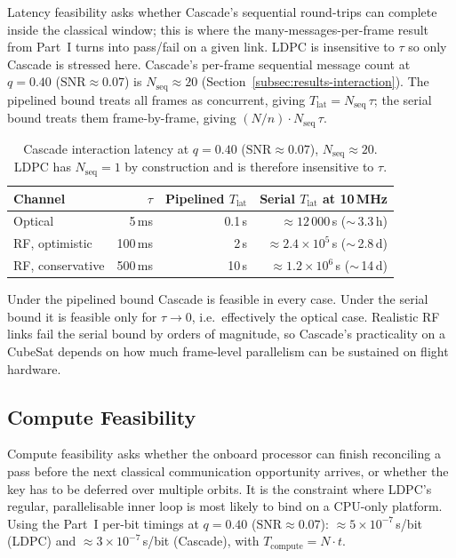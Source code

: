 \documentclass{UoYCSproject}
\begin{document}
Latency feasibility asks whether Cascade's sequential round-trips can
complete inside the classical window; this is where the
many-messages-per-frame result from Part~I turns into pass/fail on
a given link. LDPC is insensitive to $\tau$ so only Cascade is stressed
here.
Cascade's per-frame sequential message count at $q = 0.40$
($\mathrm{SNR}\!\approx\!0.07$) is $N_{\text{seq}} \approx 20$
(Section~\ref{subsec:results-interaction}). The pipelined bound treats all
frames as concurrent, giving $T_{\text{lat}} = N_{\text{seq}}\,\tau$; the
serial bound treats them frame-by-frame, giving
$(N/n) \cdot N_{\text{seq}}\,\tau$.

\begin{table}[H]
    \centering
    \small
    \begin{tabular}{lrrr}
        \toprule
        Channel & $\tau$ & Pipelined $T_{\text{lat}}$ & Serial $T_{\text{lat}}$ at 10\,MHz\\
        \midrule
        Optical              & 5\,ms    & 0.1\,s  & $\approx 12\,000$\,s ($\sim$\,3.3\,h)\\
        RF, optimistic       & 100\,ms  & 2\,s    & $\approx 2.4\!\times\!10^{5}$\,s ($\sim$\,2.8\,d)\\
        RF, conservative     & 500\,ms  & 10\,s   & $\approx 1.2\!\times\!10^{6}$\,s ($\sim$\,14\,d)\\
        \bottomrule
    \end{tabular}
    \caption{Cascade interaction latency at $q = 0.40$
    ($\mathrm{SNR}\!\approx\!0.07$), $N_{\text{seq}} \approx 20$. LDPC has
    $N_{\text{seq}} = 1$ by construction and is therefore insensitive to $\tau$.}
    \label{tab:part2-latency}
\end{table}

Under the pipelined bound Cascade is feasible in every case. Under the
serial bound it is feasible only for $\tau \to 0$, i.e.\ effectively the
optical case. Realistic RF links fail the serial bound by orders of
magnitude, so Cascade's practicality on a CubeSat depends on how much
frame-level parallelism can be sustained on flight hardware.

\subsection{Compute Feasibility}
\label{subsec:results-compute-feasibility}

Compute feasibility asks whether the onboard processor can finish
reconciling a pass before the next classical communication opportunity
arrives, or whether the key has to be deferred over multiple orbits.
It is the constraint where LDPC's regular, parallelisable inner loop is
most likely to bind on a CPU-only platform. Using the Part~I per-bit
timings at $q = 0.40$ ($\mathrm{SNR}\!\approx\!0.07$):
$\approx 5\!\times\!10^{-7}$\,s/bit (LDPC) and
$\approx 3\!\times\!10^{-7}$\,s/bit (Cascade), with
$T_{\text{compute}} = N \cdot t$.
\end{document}
